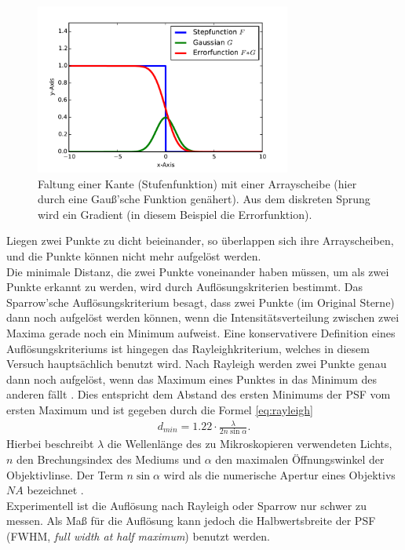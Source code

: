 \begin{figure}
	\centering
	\includegraphics[width=0.75\textwidth]{plots/convolve.pdf}
	\caption{Faltung einer Kante (Stufenfunktion) mit einer Arrayscheibe (hier durch eine Gauß'sche Funktion genähert). Aus dem diskreten Sprung wird ein Gradient (in diesem Beispiel die Errorfunktion).}\label{fig:convolution}
\end{figure}
Liegen zwei Punkte zu dicht beieinander, so überlappen sich ihre Arrayscheiben, und die Punkte können nicht mehr aufgelöst werden.\\
Die minimale Distanz, die zwei Punkte voneinander haben müssen, um als zwei Punkte erkannt zu werden, wird durch Auflösungskriterien bestimmt.
Das Sparrow'sche Auflösungskriterium \cite{sparrow} besagt, dass zwei Punkte (im Original Sterne) dann noch aufgelöst werden können, wenn die Intensitätsverteilung zwischen zwei Maxima gerade noch ein Minimum aufweist.
Eine konservativere Definition eines Auflösungskriteriums ist hingegen das Rayleighkriterium, welches in diesem Versuch hauptsächlich benutzt wird.
Nach Rayleigh werden zwei Punkte genau dann noch aufgelöst, wenn das Maximum eines Punktes in das Minimum des anderen fällt \cite{Dem2}.
Dies entspricht dem Abstand des ersten Minimums der PSF vom ersten Maximum und ist gegeben durch die Formel \ref{eq:rayleigh}
\begin{align}
	d_{min} = 1.22\cdot \frac{\lambda}{2n\sin \alpha}. \label{eq:rayleigh}
\end{align}
Hierbei beschreibt $\lambda$ die Wellenlänge des zu Mikroskopieren verwendeten Lichts, $n$ den Brechungsindex des Mediums und $\alpha$ den maximalen Öffnungswinkel der Objektivlinse.
Der Term $n\sin\alpha$ wird als die numerische Apertur eines Objektivs $NA$ bezeichnet \cite{Born}.
\\
Experimentell ist die Auflösung nach Rayleigh oder Sparrow nur schwer zu messen. 
Als Maß für die Auflösung kann jedoch die Halbwertsbreite der PSF (FWHM, \emph{full width at half maximum}) benutzt werden. 
